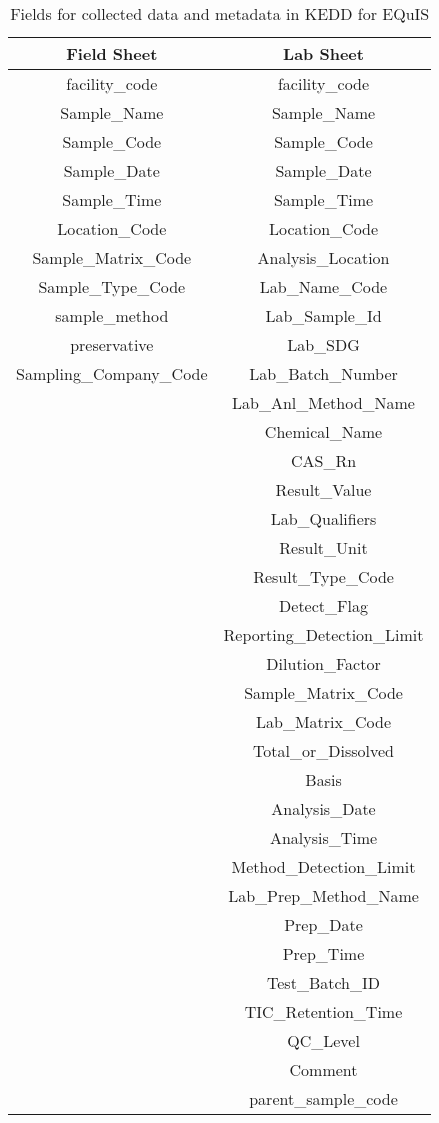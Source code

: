 \begin{table}[H]
\centering
\caption{Fields for collected data and metadata in KEDD for EQuIS}
\label{tb:kedd}
\begin{tabular}{@{}cc@{}}
\toprule
\textbf{Field Sheet} & \textbf{Lab Sheet} \\ \midrule
facility\_code & facility\_code \\
Sample\_Name & Sample\_Name \\
Sample\_Code & Sample\_Code \\
Sample\_Date & Sample\_Date \\
Sample\_Time & Sample\_Time \\
Location\_Code & Location\_Code \\
Sample\_Matrix\_Code & Analysis\_Location \\
Sample\_Type\_Code & Lab\_Name\_Code \\
sample\_method & Lab\_Sample\_Id \\
preservative & Lab\_SDG \\
Sampling\_Company\_Code & Lab\_Batch\_Number \\
 & Lab\_Anl\_Method\_Name \\
 & Chemical\_Name \\
 & CAS\_Rn \\
 & Result\_Value \\
 & Lab\_Qualifiers \\
 & Result\_Unit \\
 & Result\_Type\_Code \\
 & Detect\_Flag \\
 & Reporting\_Detection\_Limit \\
 & Dilution\_Factor \\
 & Sample\_Matrix\_Code \\
 & Lab\_Matrix\_Code \\
 & Total\_or\_Dissolved \\
 & Basis \\
 & Analysis\_Date \\
 & Analysis\_Time \\
 & Method\_Detection\_Limit \\
 & Lab\_Prep\_Method\_Name \\
 & Prep\_Date \\
 & Prep\_Time \\
 & Test\_Batch\_ID \\
 & TIC\_Retention\_Time \\
 & QC\_Level \\
 & Comment \\
 & parent\_sample\_code \\ \bottomrule
\end{tabular}
\end{table}

